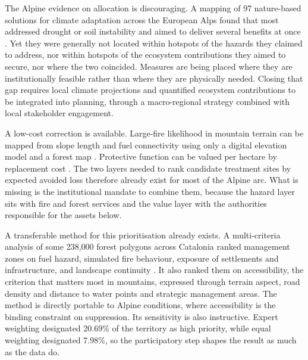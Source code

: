 \documentclass[11pt,a4paper]{article}
\begin{document}
The Alpine evidence on allocation is discouraging. A mapping of 97 nature-based solutions for climate adaptation across the European Alps found that most addressed drought or soil instability and aimed to deliver several benefits at once \citep{dubo_nature-based_2023}. Yet they were generally not located within hotspots of the hazards they claimed to address, nor within hotspots of the ecosystem contributions they aimed to secure, nor where the two coincided. Measures are being placed where they are institutionally feasible rather than where they are physically needed. Closing that gap requires local climate projections and quantified ecosystem contributions to be integrated into planning, through a macro-regional strategy combined with local stakeholder engagement.

A low-cost correction is available. Large-fire likelihood in mountain terrain can be mapped from slope length and fuel connectivity using only a digital elevation model and a forest map \citep{conedera_linking_2024}. Protective function can be valued per hectare by replacement cost \citep{accastello_asforesee_2019}. The two layers needed to rank candidate treatment sites by expected avoided loss therefore already exist for most of the Alpine arc. What is missing is the institutional mandate to combine them, because the hazard layer sits with fire and forest services and the value layer with the authorities responsible for the assets below.

A transferable method for this prioritisation already exists. A multi-criteria analysis of some 238{,}000 forest polygons across Catalonia ranked management zones on fuel hazard, simulated fire behaviour, exposure of settlements and infrastructure, and landscape continuity \citep{krsnik_spatial_2024}. It also ranked them on accessibility, the criterion that matters most in mountains, expressed through terrain aspect, road density and distance to water points and strategic management areas. The method is directly portable to Alpine conditions, where accessibility is the binding constraint on suppression. Its sensitivity is also instructive. Expert weighting designated 20.69\% of the territory as high priority, while equal weighting designated 7.98\%, so the participatory step shapes the result as much as the data do.
\end{document}
